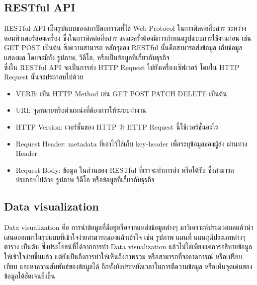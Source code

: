 \documentclass[12pt,oneside,openright,a4paper]{cpe-thai-project}
\begin{document}

\subsection{RESTful API}
\hspace*{1cm}RESTful API \cite{WhatIsRESTful} เป็นรูปแบบของสถาปัตยกรรมที่ใช้ Web Protocol ในการติดต่อสื่อสาร ระหว่างคอมพิวเตอร์สองเครื่อง ซึ่งในการติดต่อสื่อสาร แต่ละครั้งต้องมีการกำหนดรูปแบบการใช้งานก่อน เช่น GET POST เป็นต้น ซึ่งความสามารถ หลักๆของ RESTful นั้นคือสามารถส่งข้อมูล เก็บข้อมูล แสดงผล โดยจะมีทั้ง รูปภาพ, วิดีโอ, หรือเป็นข้อมูลที่เกี่ยวกับธุรกิจ\\
\hspace*{1cm}ซึ่งใน RESTful API จะเป็นการส่ง HTTP Request ไปยังเครื่องเซิฟเวอร์ โดยใน HTTP Request นั้นจะประกอบไปด้วย
\begin{itemize}
  \item {VERB: เป็น HTTP Method เช่น GET POST PATCH DELETE เป็นต้น}
  \item {URI: จุดหมายหรือตำแหน่งที่ต้องการให้ระบบทำงาน}
  \item {HTTP Version: เวอร์ชั่นของ HTTP ว่า HTTP Request นี้ใช้เวอร์ชั่นอะไร}
  \item {Request Header: metadata ที่เอาไว้ใช้เก็บ key-header เพื่อระบุข้อมูลของผู้ส่ง ผ่านทาง Header}
  \item {Request Body: ข้อมูล ในส่วนของ RESTful ที่เราจะทำการส่ง หรือได้รับ ซึ่งสามารถประกอบไปด้วย รูปภาพ วิดีโอ หรือข้อมูลที่เกี่ยวกับธุรกิจ}  
\end{itemize}

\subsection{Data visualization}
\hspace*{1cm} Data visualization \cite{WhatIsDataVisualization} คือ การนำข้อมูลที่มีอยู่หรือจากแหล่งข้อมูลต่างๆ มาวิเคราะห์ประมวลผลแล้วนำเสนอออกมาในรูปแบบที่เข้าใจง่ายสามารถมองแล้วเข้าใจ เช่น รูปภาพ แผนที่ แผนภูมิประเภทต่างๆ ตาราง เป็นต้น ซึ่งประโยชน์ที่ได้จากการทำ Data visualization แล้วไม่ใช่เพียงแค่การอธิบายข้อมูลให้เข้าใจง่ายขึ้นแล้ว แต่ยังเป็นถึงการทำให้เห็นถึงภาพรวม หรือสามารถที่จะคาดการณ์ หรือเปรียบเทียบ และหาความสัมพันธ์ของข้อมูลได้ อีกทั้งยังประหยัดเวลาในการตีความข้อมูล หรือเห็นจุดเด่นของข้อมูลได้ชัดเจนยิ่งขึ้น 
\end{document}
